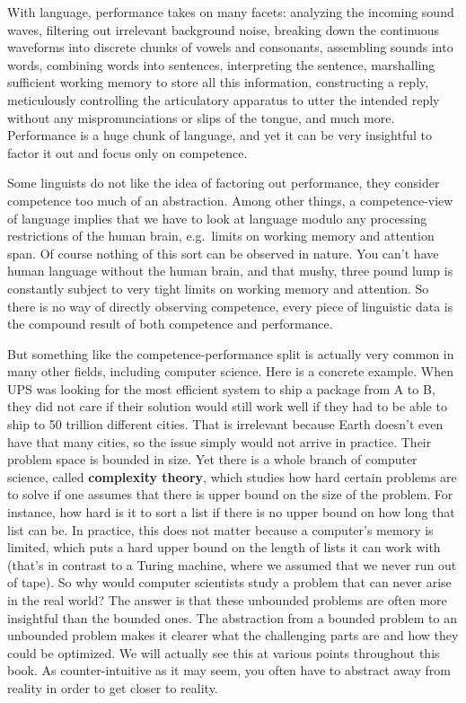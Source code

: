 With language, performance takes on many facets:
analyzing the incoming sound waves,
filtering out irrelevant background noise,
breaking down the continuous waveforms into discrete chunks of vowels and consonants, 
assembling sounds into words, 
combining words into sentences,
interpreting the sentence,
marshalling sufficient working memory to store all this information,
constructing a reply,
meticulously controlling the articulatory apparatus to utter the intended reply without any mispronunciations or slips of the tongue,
and much more.
Performance is a huge chunk of language, and yet it can be very insightful to factor it out and focus only on competence.

Some linguists do not like the idea of factoring out performance, they consider competence too much of an abstraction.
Among other things, a competence-view of language implies that we have to look at language modulo any processing restrictions of the human brain, e.g.~limits on working memory and attention span.
Of course nothing of this sort can be observed in nature.
You can't have human language without the human brain, and that mushy, three pound lump is constantly subject to very tight limits on working memory and attention.
So there is no way of directly observing competence, every piece of linguistic data is the compound result of both competence and performance.

But something like the competence-performance split is actually very common in many other fields, including computer science.
Here is a concrete example.
When UPS was looking for the most efficient system to ship a package from A to B, they did not care if their solution would still work well if they had to be able to ship to 50 trillion different cities. 
That is irrelevant because Earth doesn't even have that many cities, so the issue simply would not arrive in practice.
Their problem space is bounded in size.
Yet there is a whole branch of computer science, called \textbf{complexity theory}, which studies how hard certain problems are to solve if one assumes that there is upper bound on the size of the problem.
For instance, how hard is it to sort a list if there is no upper bound on how long that list can be.
In practice, this does not matter because a computer's memory is limited, which puts a hard upper bound on the length of lists it can work with (that's in contrast to a Turing machine, where we assumed that we never run out of tape).
So why would computer scientists study a problem that can never arise in the real world?
The answer is that these unbounded problems are often more insightful than the bounded ones.
The abstraction from a bounded problem to an unbounded problem makes it clearer what the challenging parts are and how they could be optimized.
We will actually see this at various points throughout this book.
As counter-intuitive as it may seem, you often have to abstract away from reality in order to get closer to reality.

